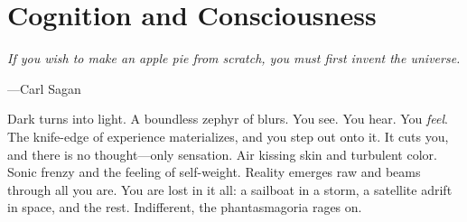 \toclineskip
\section{Cognition and Consciousness}

\vspace{4mm}
\begin{displayquote}
	\textit{If you wish to make an apple pie from scratch, you must first invent the universe.}
	\vspace{2mm}
	\begin{flushright}
		---Carl Sagan
	\end{flushright}
\end{displayquote}
\vspace{4mm}

Dark turns into light. A boundless zephyr of blurs. You see. You hear. You \textit{feel}. The knife-edge of experience materializes, and you step out onto it. It cuts you, and there is no thought---only sensation. Air kissing skin and turbulent color. Sonic frenzy and the feeling of self-weight. Reality emerges raw and beams through all you are. You are lost in it all: a sailboat in a storm, a satellite adrift in space, and the rest. Indifferent, the phantasmagoria rages on. \\









